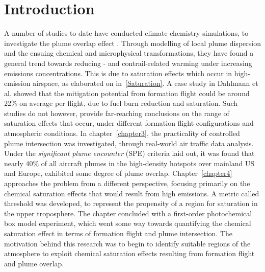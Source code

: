 \section{Introduction}
A number of studies to date have conducted climate-chemistry simulations, to investigate the plume overlap effect \cite{Kraabol2000b, Marks2020,Dahlmann2020}. Through modelling of local plume dispersion and the ensuing chemical and microphysical transformations, they have found a general trend towards reducing - and contrail-related warming under increasing emissions concentrations. This is due to saturation effects which occur in high-emission airspace, as elaborated on in~\ref{Saturation}. A case study in Dahlmann et al. \cite{Dahlmann2020} showed that the mitigation potential from formation flight could be around 22\% on average per flight, due to fuel burn reduction and  saturation. Such studies do not however, provide far-reaching conclusions on the range of saturation effects that occur, under different formation flight configurations and atmospheric conditions. In chapter~\ref{chapter3}, the practicality of controlled plume intersection was investigated, through real-world air traffic data analysis. Under the \textit{significant plume encounter} (SPE) criteria laid out, it was found that nearly 40\% of all aircraft plumes in the high-density hotspots over mainland US and Europe, exhibited some degree of plume overlap. Chapter~\ref{chapter4} approaches the problem from a different perspective, focusing primarily on the chemical saturation effects that would result from high  emissions. A metric called  threshold was developed, to represent the propensity of a region for  saturation in the upper troposphere. The chapter concluded with a first-order photochemical box model experiment, which went some way towards quantifying the chemical saturation effect in terms of formation flight and plume intersection. The motivation behind this research was to begin to identify suitable regions of the atmosphere to exploit chemical saturation effects resulting from formation flight and plume overlap. 


